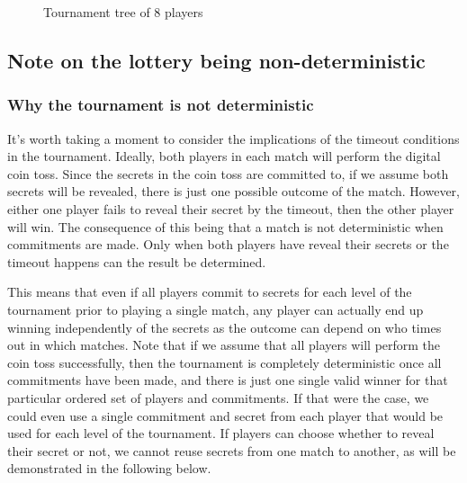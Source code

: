 \begin{figure}[htbp]
  \centering
  
  \caption{Tournament tree of 8 players}
  \label{fig:tournament-tree}
\end{figure}

\subsection{Note on the lottery being non-deterministic}

\subsubsection{Why the tournament is not deterministic}  %
It's worth taking a moment to consider the implications of the timeout conditions in the tournament. Ideally, both players in each match will perform the digital coin toss. Since the secrets in the coin toss are committed to, if we assume both secrets will be revealed, there is just one possible outcome of the match. However, either one player fails to reveal their secret by the timeout, then the other player will win. The consequence of this being that a match is not deterministic when commitments are made. Only when both players have reveal their secrets or the timeout happens can the result be determined. 

This means that even if all players commit to secrets for each level of the tournament prior to playing a single match, any player can actually end up winning independently of the secrets as the outcome can depend on who times out in which matches. Note that if we assume that all players will perform the coin toss successfully, then the tournament is completely deterministic once all commitments have been made, and there is just one single valid winner for that particular ordered set of players and commitments. If that were the case, we could even use a single commitment and secret from each player that would be used for each level of the tournament. If players can choose whether to reveal their secret or not, we cannot reuse secrets from one match to another, as will be demonstrated in the following below.

